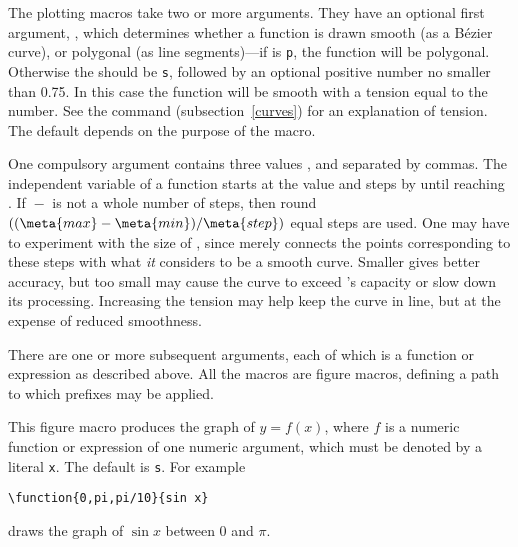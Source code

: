 \documentclass[letterpaper]{article}
\begin{document}
The plotting macros take two or more arguments. They have an optional
first argument, , which determines whether a function is
drawn smooth (as a \MF{} B\'ezier curve), or polygonal (as line
segments)---if  is \texttt{p}, the function will be
polygonal. Otherwise the  should be \texttt{s}, followed by
an optional positive number no smaller than 0.75. In this case the
function will be smooth with a tension equal to the number. See the
 command (subsection~\ref{curves}) for an explanation of
tension. The default  depends on the purpose of the macro.

One compulsory argument contains three values ,  and
 separated by commas.  The independent variable of a function
starts at the value  and steps by  until reaching
. If ${}-{}$ is not a whole number of
steps, then round$((\meta{max}-\meta{min})/\meta{step})$ equal steps are
used. One may have to experiment with the size of , since
\MF{} merely connects the points corresponding to these steps with what
\emph{it} considers to be a smooth curve. Smaller  gives
better accuracy, but too small may cause the curve to exceed \MF{}'s
capacity or slow down its processing. Increasing the tension may help
keep the curve in line, but at the expense of reduced smoothness.

There are one or more subsequent arguments, each of which is a \MF{}
function or expression as described above. All the macros are figure
macros, defining a path to which prefixes may be applied.

\begin{cd}
%
\end{cd}

This figure macro produces the graph of $y = f(x)$, where $f$ is a \MF{} numeric
function or expression of one numeric argument, which must be denoted by
a literal \texttt{x}. The default  is \texttt{s}. For example
\begin{verbatim}
\function{0,pi,pi/10}{sin x}
\end{verbatim}
draws the graph of $\sin x$ between 0 and $\pi$.

\begin{cd}
%
    \\
%
\end{cd}
\end{document}
